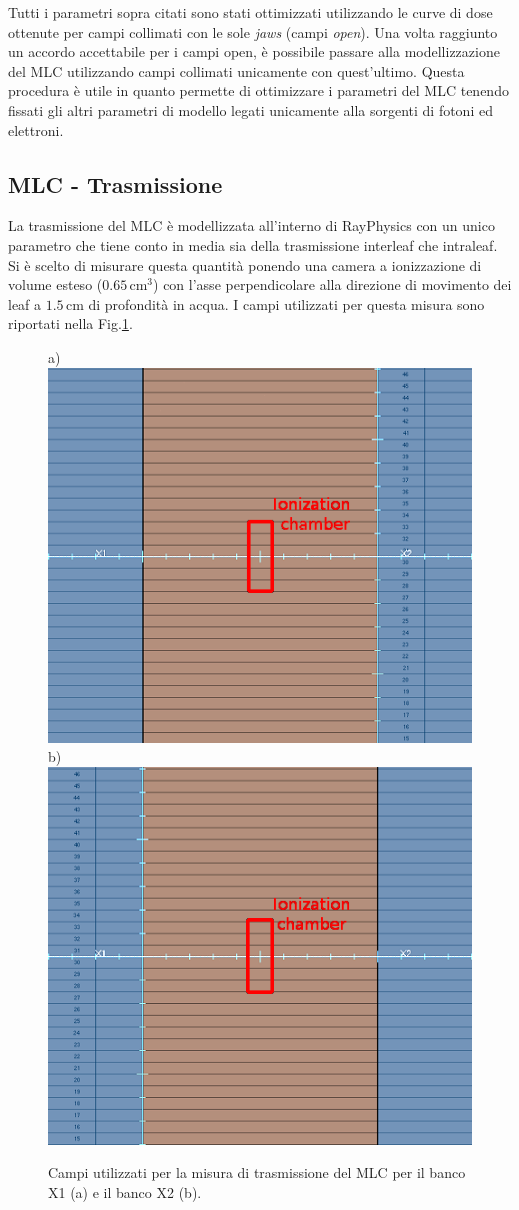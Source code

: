Tutti i parametri sopra citati sono stati ottimizzati utilizzando le curve di dose ottenute per campi collimati con le sole \textit{jaws} (campi \textit{open}). Una volta raggiunto un accordo accettabile per i campi open, è possibile passare alla modellizzazione del MLC utilizzando campi collimati unicamente con quest'ultimo. Questa procedura è utile in quanto permette di ottimizzare i parametri del MLC tenendo fissati gli altri parametri di modello legati unicamente alla sorgenti di fotoni ed elettroni.

\subsection{MLC - Trasmissione}
\label{sec:MLC-trans}
La trasmissione del MLC è modellizzata all'interno di RayPhysics con un unico parametro che tiene conto in media sia della trasmissione interleaf che intraleaf. Si è scelto di misurare questa quantità ponendo una camera a ionizzazione di volume esteso ($0.65\,$cm$^3$) con l'asse perpendicolare alla direzione di movimento dei leaf a $1.5\,$cm di profondità in acqua. I campi utilizzati per questa misura sono riportati nella Fig.\ref{fig:MLC_Trans}. 
\begin{figure}
\centering
a)\includegraphics[width=.43\textwidth]{./cap2/MLC_TransX1.png}
b)\includegraphics[width=.43\textwidth]{./cap2/MLC_TransX2.png}
\caption{Campi utilizzati per la misura di trasmissione del MLC per il banco X1 (a) e il banco X2 (b).}
\label{fig:MLC_Trans}
\end{figure}

